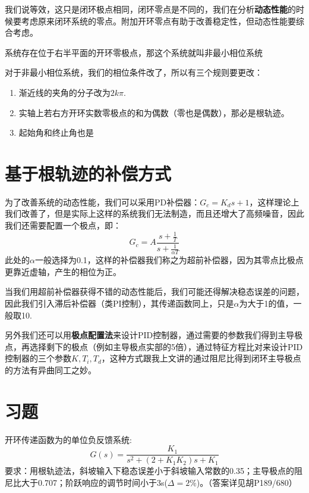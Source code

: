 \documentclass[lang=cn,10pt]{elegantbook}
\begin{document}
我们说等效，这只是闭环极点相同，闭环零点是不同的，我们在分析\textbf{动态性能}的时候要考虑原来闭环系统的零点。附加开环零点有助于改善稳定性，但动态性能要综合考虑。

\begin{definition}[非最小相位系统]
    系统存在位于右半平面的开环零极点，那这个系统就叫非最小相位系统
\end{definition}

对于非最小相位系统，我们的相位条件改了，所以有三个规则要更改：
\begin{enumerate}
    \item 渐近线的夹角的分子改为$2k\pi$.
    \item 实轴上若右方开环实数零极点的和为偶数（零也是偶数），那必是根轨迹。
    \item 起始角和终止角也是%
\end{enumerate}

\section{基于根轨迹的补偿方式}
为了改善系统的动态性能，我们可以采用PD补偿器：$G_c = K_ds+1$，这样理论上我们改善了，但是实际上这样的系统我们无法制造，而且还增大了高频噪音，因此我们还需要配置一个极点，即：
\[G_c = A \frac{s+\frac{1}{T}}{s+\frac{1}{\alpha T}}\]
此处的$\alpha$一般选择为0.1，这样的补偿器我们称之为超前补偿器，因为其零点比极点更靠近虚轴，产生的相位为正。

当我们用超前补偿器获得不错的动态性能后，我们可能还得解决稳态误差的问题，因此我们引入滞后补偿器（类PI控制），其传递函数同上，只是$\alpha$为大于1的值，一般取10.

另外我们还可以用\textbf{极点配置法}来设计PID控制器，通过需要的参数我们得到主导极点，再选择剩下的极点（例如主导极点实部的5倍），通过特征方程比对来设计PID控制器的三个参数$K,T_i,T_d$，这种方式跟我上文讲的通过阻尼比得到闭环主导极点的方法有异曲同工之妙。

\section{习题}
\begin{exercise}
    开环传递函数为的单位负反馈系统:
    \[G(s) = \frac{K_1}{s^2+(2+K_1K_2)s+K_1}\]
    要求：用根轨迹法，斜坡输入下稳态误差小于斜坡输入常数的0.35；主导极点的阻尼比大于0.707；阶跃响应的调节时间小于3s($\Delta=2\%$)。（答案详见胡P189/680）
\end{exercise}
\end{document}
